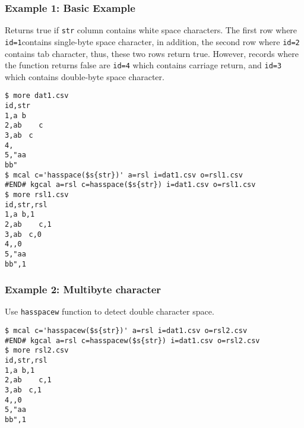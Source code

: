 \subsubsection*{Example 1: Basic Example}

Returns true if \verb|str| column contains white space characters. The first row where \verb|id=1|contains single-byte space character, in addition, the second row where \verb|id=2| contains tab character, thus, these two rows return true. However, records where the function returns false are \verb|id=4| which contains carriage return, and \verb|id=3| which contains double-byte space character.


\begin{Verbatim}[baselinestretch=0.7,frame=single]
$ more dat1.csv
id,str
1,a b
2,ab	c
3,ab　c
4,
5,"aa
bb"
$ mcal c='hasspace($s{str})' a=rsl i=dat1.csv o=rsl1.csv
#END# kgcal a=rsl c=hasspace($s{str}) i=dat1.csv o=rsl1.csv
$ more rsl1.csv
id,str,rsl
1,a b,1
2,ab	c,1
3,ab　c,0
4,,0
5,"aa
bb",1
\end{Verbatim}
\subsubsection*{Example 2: Multibyte character}

Use \verb|hasspacew| function to detect double character space.


\begin{Verbatim}[baselinestretch=0.7,frame=single]
$ mcal c='hasspacew($s{str})' a=rsl i=dat1.csv o=rsl2.csv
#END# kgcal a=rsl c=hasspacew($s{str}) i=dat1.csv o=rsl2.csv
$ more rsl2.csv
id,str,rsl
1,a b,1
2,ab	c,1
3,ab　c,1
4,,0
5,"aa
bb",1
\end{Verbatim}
